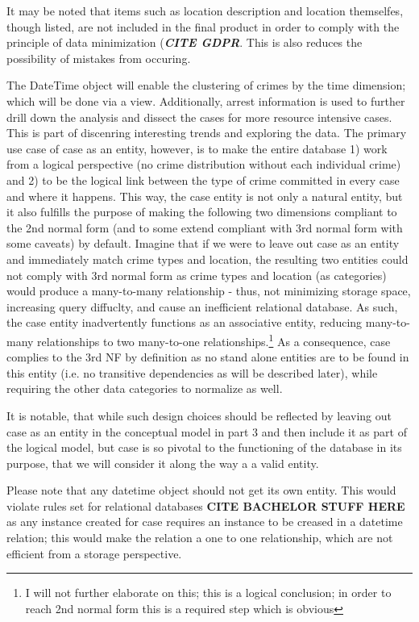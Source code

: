 \documentclass[a4paper]{article}
\begin{document}
It may be noted that items such as location description and location themselfes, though listed, are not included in the final product in order to comply with the principle of data minimization (\textbf{\textit{CITE GDPR}}. This is also reduces the possibility of mistakes from occuring. 

The DateTime object will enable the clustering of crimes by the time dimension; which will be done via a view. Additionally, arrest information is used to further drill down the analysis and dissect the cases for more resource intensive cases. This is part of discenring interesting trends and exploring the data. The primary use case of case as an entity, however, is to make the entire database 1) work from a logical perspective (no crime distribution without each individual crime) and 2) to be the logical link between the type of crime committed in every case and where it happens. This way, the case entity is not only a natural entity, but it also fulfills the purpose of making the following two dimensions compliant to the 2nd normal form (and to some extend compliant with 3rd normal form with some caveats) by default. Imagine that if we were to leave out case as an entity and immediately match crime types and location, the resulting two entities could not comply with 3rd normal form as crime types and location (as categories) would produce a many-to-many relationship - thus, not minimizing storage space, increasing query diffuclty, and cause an inefficient relational database. As such, the case entity inadvertently functions as an associative entity, reducing many-to-many relationships to two many-to-one relationships.\footnote{I will not further elaborate on this; this is a logical conclusion; in order to reach 2nd normal form this is a required step which is obvious} As a consequence, case complies to the 3rd NF by definition as no stand alone entities are to be found in this entity (i.e. no transitive dependencies as will be described later), while requiring the other data categories to normalize as well.

 It is notable, that while such design choices should be reflected by leaving out case as an entity in the conceptual model in part 3 and then include it as part of the logical model, but case is so pivotal to the functioning of the database in its purpose, that we will consider it along the way a a valid entity.
 
Please note that any datetime object should not get its own entity. This would violate rules set for relational databases \textbf{CITE BACHELOR STUFF HERE} as any instance created for case requires an instance to be creased in a datetime relation; this would make the relation a one to one relationship, which are not efficient from a storage perspective. 
 
\end{document}
